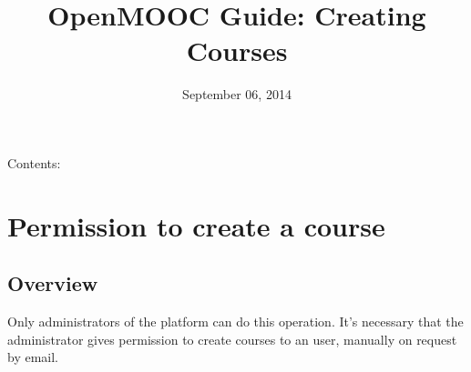 \documentclass[letterpaper,10pt,english]{sphinxmanual}
\title{OpenMOOC Guide: Creating Courses}
\date{September 06, 2014}
\author{}
\begin{document}
\maketitle
\tableofcontents
{}\label{index::doc}


Contents:


\chapter{Permission to create a course}
\label{permission_to_create_a_course:permission-to-create-a-course}\label{permission_to_create_a_course::doc}\label{permission_to_create_a_course:openmooc-guide-creating-courses}\label{permission_to_create_a_course:id1}

\section{Overview}
\label{permission_to_create_a_course:overview}
Only administrators of the platform can do this operation. It's necessary that the administrator gives permission to create courses to an user, manually on request by email.
\end{document}
